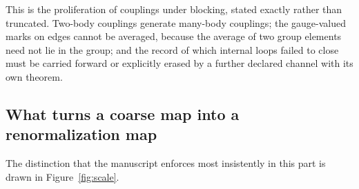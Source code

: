 \documentclass[11pt,letterpaper]{article}
\begin{document}
This is the proliferation of couplings under blocking, stated exactly rather than truncated. Two-body couplings generate many-body couplings; the gauge-valued marks on edges cannot be averaged, because the average of two group elements need not lie in the group; and the record of which internal loops failed to close must be carried forward or explicitly erased by a further declared channel with its own theorem.

\subsection{What turns a coarse map into a renormalization map}

The distinction that the manuscript enforces most insistently in this part is drawn in Figure~\ref{fig:scale}.
\end{document}
